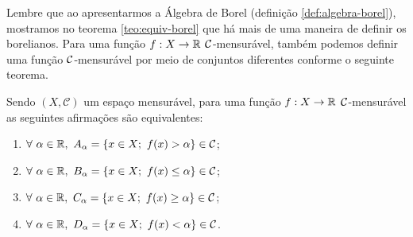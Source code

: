     Lembre que ao apresentarmos a Álgebra de Borel (definição \ref{def:algebra-borel}), mostramos no teorema \ref{teo:equiv-borel} que há mais de uma maneira de definir os borelianos.
    Para uma função $f: X \to \mathbb{R}$ $\operatorname{\mathcal{C}}$-mensurável, também podemos definir uma função $\operatorname{\mathcal{C}}$-mensurável por meio de conjuntos diferentes conforme o seguinte teorema.

\begin{theorem}
\label{teo:equiv-funcoes-mensuraveis}
    Sendo $(X,\mathcal{C})$ um espaço mensurável, para uma função $f: X \to \mathbb{R}$ $\operatorname{\mathcal{C}}$-mensurável as seguintes afirmações são equivalentes:
    \begin{multicols}{2}
        
    \begin{enumerate}[label=(\alph*)]
        \item $\forall \ \alpha \in \mathbb{R}, \ A_\alpha =\{x \in X;\ f(x) > \alpha \} \in \mathcal{C}$;
        \item $\forall \ \alpha \in \mathbb{R}, \ B_\alpha =\{x \in X;\ f(x) \leq \alpha \} \in \mathcal{C}$;
        \item $\forall \ \alpha \in \mathbb{R}, \ C_\alpha =\{x \in X;\ f(x) \geq \alpha \} \in \mathcal{C}$;
        \item $\forall \ \alpha \in \mathbb{R}, \ D_\alpha =\{x \in X;\ f(x) < \alpha \} \in \mathcal{C}$.
    \end{enumerate}
     \end{multicols}

\end{theorem}


